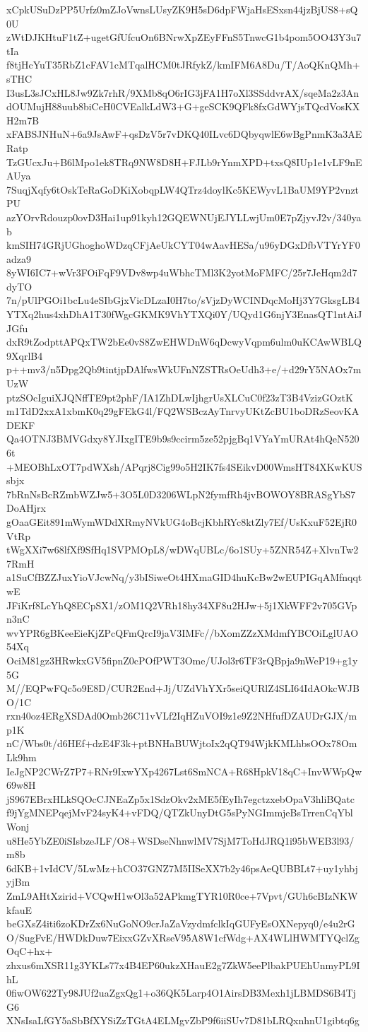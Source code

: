 xCpkUSuDzPP5Urfz0mZJoVwnsLUsyZK9H5sD6dpFWjaHsESxsn44jzBjUS8+sQ0U
zWtDJKHtuF1tZ+ugetGfUfcuOn6BNrwXpZEyFFnS5TnwcG1b4pom5OO43Y3u7tIa
f8tjHcYuT35RbZ1cFAV1cMTqalHCM0tJRfykZ/kmIFM6A8Du/T/AoQKnQMh+sTHC
I3usL3sJCxHL8Jw9Zk7rhR/9XMb8qO6rIG3jFA1H7oXl3SSddvrAX/sqeMa2z3An
dOUMujH88uub8biCeH0CVEalkLdW3+G+geSCK9QFk8fxGdWYjsTQcdVosKXH2m7B
xFABSJNHuN+6a9JsAwF+qsDzV5r7vDKQ40ILvc6DQbyqwlE6wBgPnmK3a3AERatp
TzGUcxJu+B6lMpo1ek8TRq9NW8D8H+FJLb9rYnmXPD+txsQ8IUp1e1vLF9nEAUya
7SuqjXqfy6tOskTeRaGoDKiXobqpLW4QTrz4doylKc5KEWyvL1BaUM9YP2vnztPU
azYOrvRdouzp0ovD3Hai1up91kyh12GQEWNUjEJYLLwjUm0E7pZjyvJ2v/340yab
kmSIH74GRjUGhoghoWDzqCFjAeUkCYT04wAavHESa/u96yDGxDfbVTYrYF0adza9
8yWI6IC7+wVr3FOiFqF9VDv8wp4uWbhcTMl3K2yotMoFMFC/25r7JeHqm2d7dyTO
7n/pUlPGOi1bcLu4eSIbGjxVicDLzaI0H7to/sVjzDyWCINDqcMoHj3Y7GksgLB4
YTXq2hus4xhDhA1T30fWgcGKMK9VhYTXQi0Y/UQyd1G6njY3EnasQT1ntAiJJGfu
dxR9tZodpttAPQxTW2bEe0vS8ZwEHWDnW6qDcwyVqpm6ulm0uKCAwWBLQ9XqrlB4
p++mv3/n5Dpg2Qb9tintjpDAlfwsWkUFnNZSTRsOeUdh3+e/+d29rY5NAOx7mUzW
ptzSOcIguiXJQNffTE9pt2phF/IA1ZhDLwIjhgrUsXLCuC0f23zT3B4VzizGOztK
m1TdD2xxA1xbmK0q29gFEkG4l/FQ2WSBczAyTnrvyUKtZcBU1boDRzSeovKADEKF
Qa4OTNJ3BMVGdxy8YJIxgITE9b9s9ccirm5ze52pjgBq1VYaYmURAt4hQeN5206t
+MEOBhLxOT7pdWXsh/APqrj8Cig99o5H2IK7fs4SEikvD00WmsHT84XKwKUSsbjx
7bRnNsBcRZmbWZJw5+3O5L0D3206WLpN2fymfRh4jvBOWOY8BRASgYbS7DoAHjrx
gOaaGEit891mWymWDdXRmyNVkUG4oBcjKbhRYc8ktZly7Ef/UsKxuF52EjR0VtRp
tWgXXi7w68lfXf9SfHq1SVPMOpL8/wDWqUBLc/6o1SUy+5ZNR54Z+XlvnTw27RmH
a1SuCfBZZJuxYioVJcwNq/y3bISiweOt4HXmaGID4huKcBw2wEUPIGqAMfnqqtwE
JFiKrf8LcYhQ8ECpSX1/zOM1Q2VRh18hy34XF8u2HJw+5j1XkWFF2v705GVpn3nC
wvYPR6gBKeeEieKjZPcQFmQrcI9jaV3IMFc//bXomZZzXMdmfYBCOiLglUAO54Xq
OciM81gz3HRwkxGV5fipnZ0cPOfPWT3Ome/UJol3r6TF3rQBpja9nWeP19+g1y5G
M//EQPwFQc5o9E8D/CUR2End+Jj/UZdVhYXr5seiQURlZ4SLI64IdAOkcWJBO/1C
rxn40oz4ERgXSDAd0Omb26C11vVLf2IqHZuVOI9z1e9Z2NHfufDZAUDrGJX/mp1K
nC/Wbs0t/d6HEf+dzE4F3k+ptBNHaBUWjtoIx2qQT94WjkKMLhbsOOx78OmLk9hm
IeJgNP2CWrZ7P7+RNr9IxwYXp4267Lst6SmNCA+R68HpkV18qC+InvWWpQw69w8H
jS967EBrxHLkSQOcCJNEaZp5x1SdzOkv2xME5fEyIh7egctzxebOpaV3hliBQatc
f9jYgMNEPqejMvF24syK4+vFDQ/QTZkUnyDtG5sPyNGImmjeBsTrrenCqYblWonj
u8He5YbZE0iSIsbzeJLF/O8+WSDseNhnwlMV7SjM7ToHdJRQ1i95bWEB3l93/m8b
6dKB+1vIdCV/5LwMz+hCO37GNZ7M5IISeXX7b2y46psAeQUBBLt7+uy1yhbjyjBm
ZmL9AHtXzirid+VCQwH1wOl3a52APkmgTYR10R0ce+7Vpvt/GUh6cBIzNKWkfauE
beGXsZ4iti6zoKDrZx6NuGoNO9crJaZaVzydmfclkIqGUFyEsOXNepyq0/e4u2rG
O/SugFvE/HWDkDuw7EixxGZvXRseV95A8W1cfWdg+AX4WLlHWMTYQclZgOqC+hx+
zhxus6mXSR11g3YKLs77x4B4EP60ukzXHauE2g7ZkW5eePlbakPUEhUnmyPL9IhL
0fiwOW622Ty98JUf2uaZgxQg1+o36QK5Larp4O1AirsDB3Mexh1jLBMDS6B4TjG6
XNsIsaLfGY5aSbBfXYSiZzTGtA4ELMgvZbP9f6iiSUv7D81bLRQxnhnU1gibtq6g
